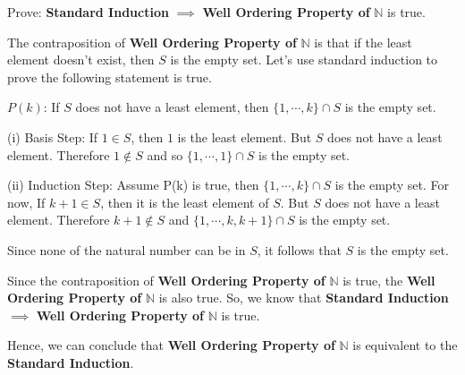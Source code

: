\begin{flushleft}
Prove: \textbf{Standard Induction} $\implies$ \textbf{Well Ordering Property 
of} $\mathbb{N}$ is true. \\
\vspace{10px}

The contraposition of \textbf{Well Ordering Property of} $\mathbb{N}$ is
that if the least element doesn't exist, then $S$ is the empty set. 
Let's use standard induction to prove the following statement is true. \\
\vspace{10px}

$ P(k) $: If $ S $ does not have a least element, then $\{1, \cdots, k\} \cap S$ 
is the empty set.
\vspace{10px}

(i) Basis Step: If $ 1 \in S $, then $ 1 $ is the least element. But $ S $ does not 
have a least element. Therefore $ 1 \notin S $ and so $\{1, \cdots, 1\} \cap S$ is 
the empty set.
\vspace{10px}

(ii) Induction Step: 
Assume P(k) is true, then $\{1, \cdots, k\} \cap S$ is the empty set. For now, 
If $k + 1 \in S$, then it is the least element of $S$. But $ S $ does not 
have a least element. Therefore $ k + 1 \notin S $ and $\{1, \cdots, k, k + 1\}
 \cap S$ is the empty set.\\
\vspace{10px}

Since none of the natural number can be in $ S $, it follows that $ S $ is the empty set.
\vspace{10px}
 
Since the contraposition of \textbf{Well Ordering Property of} $\mathbb{N}$ is 
true, the \textbf{Well Ordering Property of} $\mathbb{N}$ is also true. So, we 
know that \textbf{Standard Induction} $\implies$ \textbf{Well Ordering Property 
of} $\mathbb{N}$ is true. 
\end{flushleft}

\begin{flushleft}
Hence, we can conclude that \textbf{Well Ordering Property of} $\mathbb{N}$ is 
equivalent to the \textbf{Standard Induction}. \\
\end{flushleft}

